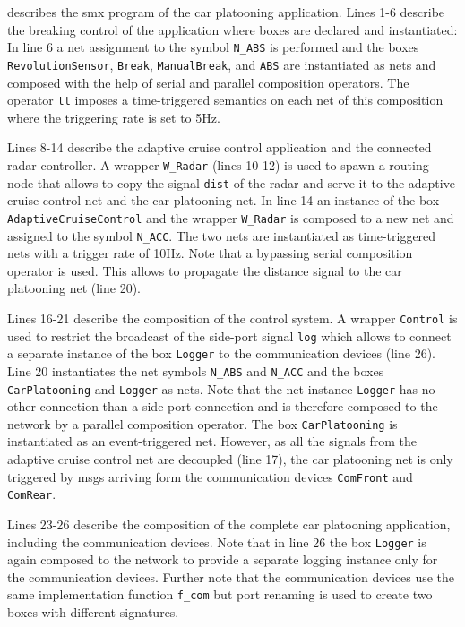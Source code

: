 \Fig{\ref{list_cpa_net}} describes the \gls*{smx} program of the car platooning application.
Lines 1-6 describe the breaking control of the application where boxes are declared and instantiated:
In line 6 a net assignment to the symbol \texttt{N\_ABS} is performed and the boxes \texttt{RevolutionSensor}, \texttt{Break}, \texttt{ManualBreak}, and \texttt{ABS} are instantiated as nets and composed with the help of serial and parallel composition operators.
The operator \texttt{tt} imposes a time-triggered semantics on each net of this composition where the triggering rate is set to 5Hz.

Lines 8-14 describe the adaptive cruise control application and the connected radar controller.
A wrapper \texttt{W\_Radar} (lines 10-12) is used to spawn a routing node that allows to copy the signal \texttt{dist} of the radar and serve it to the adaptive cruise control net and the car platooning net.
In line 14 an instance of the box \texttt{AdaptiveCruiseControl} and the wrapper \texttt{W\_Radar} is composed to a new net and assigned to the symbol \mbox{\texttt{N\_ACC}}.
The two nets are instantiated as time-triggered nets with a trigger rate of 10Hz.
Note that a bypassing serial composition operator is used.
This allows to propagate the distance signal to the car platooning net (line 20).

Lines 16-21 describe the composition of the control system.
A wrapper \texttt{Control} is used to restrict the broadcast of the side-port signal \texttt{log} which allows to connect a separate instance of the box \texttt{Logger} to the communication devices (line 26).
Line 20 instantiates the net symbols \texttt{N\_ABS} and \texttt{N\_ACC} and the boxes \texttt{CarPlatooning} and \texttt{Logger} as nets.
Note that the net instance \texttt{Logger} has no other connection than a side-port connection and is therefore composed to the network by a parallel composition operator.
The box \texttt{CarPlatooning} is instantiated as an event-triggered net.
However, as all the signals from the adaptive cruise control net are decoupled (line 17), the car platooning net is only triggered by \glspl*{msg} arriving form the communication devices \texttt{ComFront} and \texttt{ComRear}.

Lines 23-26 describe the composition of the complete car platooning application, including the communication devices.
Note that in line 26 the box \texttt{Logger} is again composed to the network to provide a separate logging instance only for the communication devices.
Further note that the communication devices use the same implementation function \texttt{f\_com} but port renaming is used to create two boxes with different signatures.

